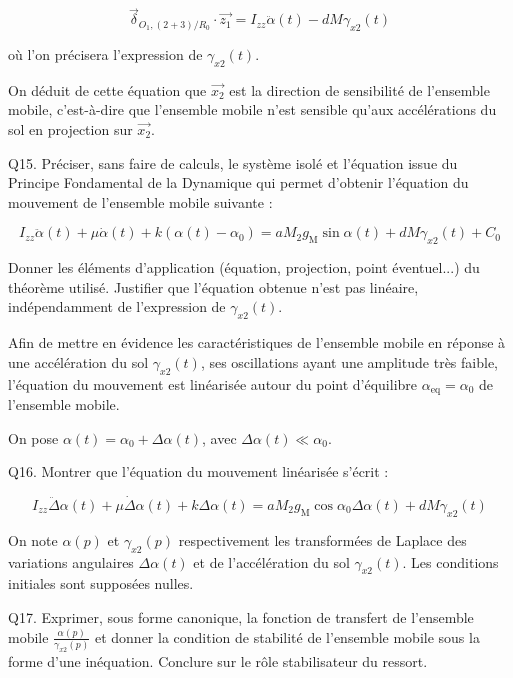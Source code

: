 {$$
\vec{\delta}_{O_{1},(2+3) / R_{0}} \cdot \overrightarrow{z_{1}}=I_{z z} \ddot{\alpha}(t)-d M \gamma_{x 2}(t)
$$

où l'on précisera l'expression de $\gamma_{x 2}(t)$.

On déduit de cette équation que $\overrightarrow{x_{2}}$ est la direction de sensibilité de l'ensemble mobile, c'est-à-dire que l'ensemble mobile n'est sensible qu'aux accélérations du sol en projection sur $\overrightarrow{x_{2}}$.

Q15. Préciser, sans faire de calculs, le système isolé et l'équation issue du Principe Fondamental de la Dynamique qui permet d'obtenir l'équation du mouvement de l'ensemble mobile suivante :


\begin{equation*}
I_{z z} \ddot{\alpha}(t)+\mu \dot{\alpha}(t)+k\left(\alpha(t)-\alpha_{0}\right)=a M_{2} g_{\mathrm{M}} \sin \alpha(t)+d M \gamma_{x 2}(t)+C_{0} \tag{eq.2}
\end{equation*}


Donner les éléments d'application (équation, projection, point éventuel...) du théorème utilisé. Justifier que l'équation obtenue n'est pas linéaire, indépendamment de l'expression de $\gamma_{x 2}(t)$.

Afin de mettre en évidence les caractéristiques de l'ensemble mobile en réponse à une accélération du sol $\gamma_{x 2}(t)$, ses oscillations ayant une amplitude très faible, l'équation du mouvement est linéarisée autour du point d'équilibre $\alpha_{\mathrm{eq}}=\alpha_{0}$ de l'ensemble mobile.

On pose $\alpha(t)=\alpha_{0}+\Delta \alpha(t)$, avec $\Delta \alpha(t) \ll \alpha_{0}$.

Q16. Montrer que l'équation du mouvement linéarisée s'écrit :


\begin{equation*}
I_{z z} \ddot{\Delta} \alpha(t)+\mu \dot{\Delta} \alpha(t)+k \Delta \alpha(t)=a M_{2} g_{\mathrm{M}} \cos \alpha_{0} \Delta \alpha(t)+d M \gamma_{x 2}(t) \tag{eq.3}
\end{equation*}


On note $\alpha(p)$ et $\gamma_{x 2}(p)$ respectivement les transformées de Laplace des variations angulaires $\Delta \alpha(t)$ et de l'accélération du sol $\gamma_{x 2}(t)$. Les conditions initiales sont supposées nulles.

Q17. Exprimer, sous forme canonique, la fonction de transfert de l'ensemble mobile $\frac{\alpha(p)}{\gamma_{x 2}(p)}$ et donner la condition de stabilité de l'ensemble mobile sous la forme d'une inéquation. Conclure sur le rôle stabilisateur du ressort.

}
